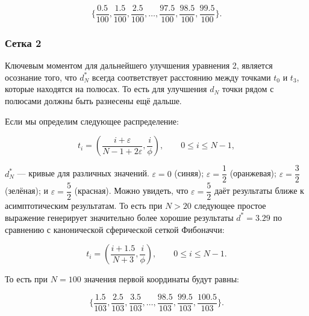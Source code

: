 \documentclass[12pt, a4paper]{article}
\begin{document}
\begin{displaymath}
	\{
		\frac{0.5}{100},
		\frac{1.5}{100},
		\frac{2.5}{100},
		\ldots,
		\frac{97.5}{100},
		\frac{98.5}{100},
		\frac{99.5}{100}
	\}.
\end{displaymath}

\subsubsection*{Сетка 2}

Ключевым моментом для дальнейшего улучшения уравнения 2, является осознание того, что $d^*_N$ всегда соответствует расстоянию между точками $t_0$ и $t_3$, которые находятся на полюсах. То есть для улучшения $d_N$ точки рядом с полюсами должны быть разнесены ещё дальше.

Если мы определим следующее распределение:

\begin{displaymath}
	t_i = \left( \frac{i + \varepsilon}{N - 1 + 2 \varepsilon}, \frac{i}{\phi} \right),
	\qquad
	0 \leq i \leq N-1,
\end{displaymath}

\noindent $d^*_N$ — кривые для различных значений. $\varepsilon=0$ (синяя); $\varepsilon=\dfrac{1}{2}$ (оранжевая); $\varepsilon=\dfrac{3}{2}$ (зелёная); и $\varepsilon=\dfrac{5}{2}$ (красная). Можно увидеть, что $\varepsilon = \dfrac{5}{2}$ даёт результаты ближе к асимптотическим результатам. То есть при $N>20$ следующее простое выражение генерирует значительно более хорошие результаты $d^* = 3.29$ по сравнению с канонической сферической сеткой Фибоначчи:

\begin{displaymath}
	t_i = \left( \frac{i + 1.5}{N + 3}, \frac{i}{\phi} \right),
	\qquad
	0 \leq i \leq N-1.
	\tag{3}
\end{displaymath}

То есть при $N=100$ значения первой координаты будут равны:

\begin{displaymath}
	\{
		\frac{1.5}{103},
		\frac{2.5}{103},
		\frac{3.5}{103},
		\ldots,
		\frac{98.5}{103},
		\frac{99.5}{103},
		\frac{100.5}{103}
	\}.
\end{displaymath}
\end{document}
